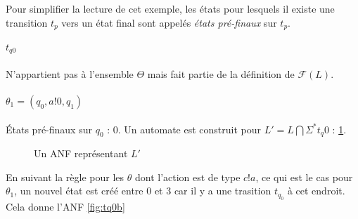 Pour simplifier la lecture de cet exemple, les états pour lesquels il existe une transition $t_p$ vers un état final sont appelés \emph{états pré-finaux} sur $t_p$.

\paragraph{$t_{q0}$} N'appartient pas à l'ensemble $\Theta$ mais fait partie de la définition de $\mathcal{F}(L)$.

\begin{figure}[H]
    \centering
\end{figure}

\paragraph{$\theta_1=(q_0,a!0,q_1)$}

États pré-finaux sur $q_0$ : ${0}$. Un automate est construit pour $L'=L\bigcap \Sigma^*t_q0$ : \ref{fig:tq0}.

\begin{figure}[H]
    \centering
    \caption{Un ANF représentant $L'$}\label{fig:tq0}
\end{figure}

En suivant la règle pour les $\theta$ dont l'action est de type $c!a$, ce qui est le cas pour $\theta_1$, un nouvel état est créé entre $0$ et $3$ car il y a une trasition $t_{q_0}$ à cet endroit. Cela donne l'ANF \ref{fig:tq0b}

